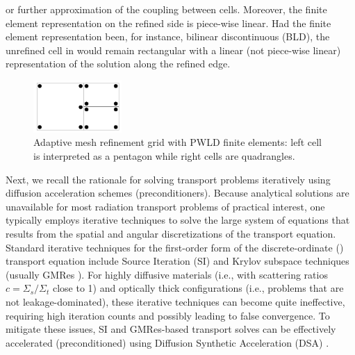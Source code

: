 or further approximation of the coupling between cells. Moreover, the finite element representation
on the refined side is piece-wise linear. Had the finite element representation been, for instance,
bilinear discontinuous (BLD), the unrefined cell in  would remain rectangular with a linear
(not piece-wise linear) representation of the solution along the refined edge. 
\begin{figure}[H]
   \centering
   \includegraphics[width=0.3\textwidth]{fig_amr.png}
   \caption{Adaptive mesh refinement grid with PWLD finite elements: left cell is interpreted as a pentagon while right cells are quadrangles.}
   \label{fig_amr}
\end{figure}



Next, we recall the rationale for solving transport problems iteratively using 
diffusion acceleration schemes (preconditioners).
Because analytical solutions are unavailable for most
radiation transport problems of practical interest, one typically employs
iterative techniques to solve the large system of equations that results from
the spatial and angular discretizations of the transport equation. Standard
iterative techniques for the first-order form of the discrete-ordinate (\sn)
transport equation include Source Iteration (SI)  and Krylov 
subspace techniques (usually GMRes \cite{gmres}). For highly diffusive materials 
(i.e., with scattering ratios $c=\Sigma_s / \Sigma_t $ close to 1) and optically 
thick configurations (i.e., problems that are not leakage-dominated), these iterative techniques 
can become quite ineffective, requiring high iteration counts and possibly 
leading to false convergence. To mitigate these issues, SI and GMRes-based transport solves 
can be effectively accelerated (preconditioned) using Diffusion Synthetic Acceleration (DSA) 
\cite{dsa_ref,larsen_dsa,consistent_p1,m4s,wla,mip}. 

